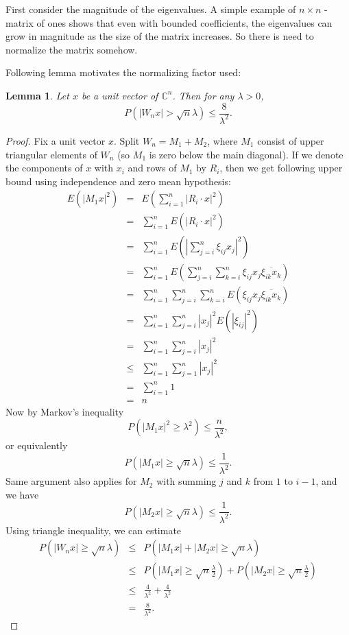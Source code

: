 \documentclass[12pt,a4paper,leqno]{report}
\newcommand{\C}{\mathbb{C}}
\theoremstyle{plain}
\newtheorem{lem}[equation]{Lemma}
\theoremstyle{definition}
\theoremstyle{remark}
\begin{document}
First consider the magnitude of the eigenvalues. A simple example of $n \times n$ -matrix of ones shows that even with bounded coefficients, the eigenvalues can grow in magnitude as the size of the matrix increases. So there is need to normalize the matrix somehow.

Following lemma motivates the normalizing factor used:

\begin{lem}
Let $x$ be a unit vector of $\C^n$. Then for any $\lambda > 0$, 
\begin{equation*}
P(|W_nx|>\sqrt{n}\lambda) \leq \frac{8}{\lambda^2}.
\end{equation*}
\end{lem}

\begin{proof}
Fix a unit vector $x$. Split $W_n = M_1 + M_2$, where $M_1$ consist of upper triangular elements of $W_n$ (so $M_1$ is zero below the main diagonal).
If we denote the components of $x$ with $x_i$ and rows of $M_1$ by $R_i$, then we get following upper bound using independence and zero mean hypothesis:
\begin{eqnarray*}
E(|M_1x|^2) & = &  
E(\sum_{i=1}^n |R_i \cdot x|^2) \\
& = & \sum_{i=1}^n E(|R_i \cdot x|^2)\\
& = & \sum_{i=1}^n 
E(|\sum_{j=i}^n \xi_{ij} x_j|^2)\\
& = & \sum_{i=1}^n 
E(\sum_{j=i}^n \sum_{k=i}^n \xi_{ij} x_j\overline{\xi_{ik} x_k}) \\
& = & \sum_{i=1}^n 
\sum_{j=i}^n \sum_{k=i}^n E(\xi_{ij} x_j\overline{\xi_{ik} x_k}) \\
& = & \sum_{i=1}^n 
\sum_{j=i}^n |x_j|^2E(|\xi_{ij}|^2)\\
& = & \sum_{i=1}^n \sum_{j=i}^n |x_j|^2\\
& \leq & \sum_{i=1}^n \sum_{j=1}^n |x_j|^2\\
& = & \sum_{i=1}^n 1\\
& = & n
\end{eqnarray*}
Now by Markov's inequality 
\begin{equation*}
P(|M_1x|^2 \geq \lambda^2) \leq  \frac{n}{\lambda^2},
\end{equation*}
or equivalently
\begin{equation*}
P(|M_1x| \geq \sqrt{n} \lambda) \leq  \frac{1}{\lambda^2}.
\end{equation*}
Same argument also applies for $M_2$ with summing $j$ and $k$ from $1$ to $i-1$, and we have
\begin{equation*}
P(|M_2x| \geq \sqrt{n} \lambda) \leq  \frac{1}{\lambda^2}. 
\end{equation*}
Using triangle inequality, we can estimate
\begin{eqnarray*}
P(|W_nx| \geq \sqrt{n} \lambda) & \leq & P(|M_1x|+|M_2x| \geq \sqrt{n} \lambda)\\
& \leq & P(|M_1x| \geq \sqrt{n} \frac{\lambda}{2}) + P(|M_2x| \geq \sqrt{n} \frac{\lambda}{2})\\
& \leq & \frac{4}{\lambda^2} + \frac{4}{\lambda^2}\\
& = & \frac{8}{\lambda^2}.
\end{eqnarray*}
\end{proof} 
\end{document}
